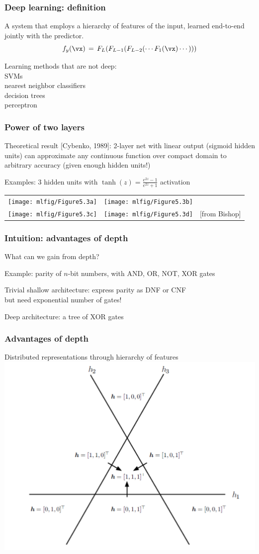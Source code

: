\documentclass[xcolor=dvipsnames]{beamer}
\begin{document}
\begin{frame}
  \frametitle{Deep learning: definition}
  \bi
\item A system that employs a hierarchy of features of the
  input, learned end-to-end jointly with the predictor.
\[f_y(\vx)\,=\,F_L(F_{L-1}(F_{L-2}(\cdots F_1(\vx)\cdots)))\]
\item Learning methods that are not deep:\\
SVMs\\
nearest neighbor classifiers\\
decision trees\\
perceptron
\ei
\end{frame}


\begin{frame}
  \frametitle{Power of two layers}
\bi\item Theoretical result [Cybenko, 1989]: 2-layer net with linear
output (sigmoid hidden units) can approximate any continuous function over compact
domain to arbitrary accuracy (given enough hidden units!)
\item Examples: 3 hidden units with $\tanh(z)=\frac{e^{2z}-1}{e^{2z}+1}$
  activation
\ei
  \begin{tabular}{ccc}
    \texttt{[image: mlfig/Figure5.3a]}&
    \texttt{[image: mlfig/Figure5.3b]}&\\
    \texttt{[image: mlfig/Figure5.3c]}&
    \texttt{[image: mlfig/Figure5.3d]}&{\small [from Bishop]}
  \end{tabular}
\end{frame}

\begin{frame}
  \frametitle{Intuition: advantages of depth}
   \bi
\item What can we gain from depth?
\item Example: parity of $n$-bit numbers, with AND, OR, NOT, XOR gates
\item Trivial shallow architecture: express parity as DNF or CNF\\
but need exponential number of gates!
\item Deep architecture: a tree of XOR gates

\ei
\end{frame}


\begin{frame}
  \frametitle{Advantages of depth}
  \bi
\item Distributed representations through hierarchy of features
\includegraphics[width=.5\textwidth]{gcb-deeprep}\raisebox{1em}{[Y. Bengio]}
\ei
\end{frame}
\end{document}
